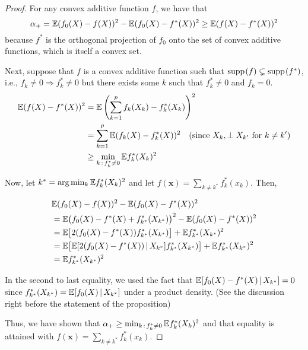 \begin{proof}

For any convex additive function $f$, we have that
\[
\alpha_+ = {\mathbb E} (f_0(X) - f(X))^2 - {\mathbb E} (f_0(X) - f^*(X))^2 \geq {\mathbb E} (f(X) - f^*(X))^2
\]
because $f^*$ is the orthogonal projection of $f_0$ onto the set of convex additive functions, which is itself a convex set. 

Next, suppose that $f$ is a convex additive function such that $\mathop{\text{supp}\kern.2ex}(f) \subsetneq \mathop{\text{supp}\kern.2ex}(f^*)$, i.e., $f_k \neq 0 \Rightarrow f^*_k \neq 0$ but there exists some $k$ such that $f^*_k \neq 0$ and $f_k = 0$. 
\begin{align*}
{\mathbb E} (f(X) - f^*(X))^2 & = {\mathbb E} \left( \sum_{k=1}^p f_k(X_k) - f^*_k(X_k) \right)^2 \\
   &= \sum_{k=1}^p {\mathbb E} (f_k(X) - f^*_k(X))^2  \quad \textrm{(since $X_k, \perp X_{k'}$ for $k \neq k'$)} \\
   &\geq \min_{k \,:\, f^*_k \neq 0} {\mathbb E} f^*_k(X_k)^2 
\end{align*}

Now, let $k^* = \arg\min_k {\mathbb E} f^*_k(X_k)^2$ and let $f(\mathbf{x}) = \sum_{k\neq k^*} f_k^*(x_k)$. Then,

\begin{align*}
& {\mathbb E} (f_0(X) - f(X))^2 - {\mathbb E} (f_0(X) - f^*(X))^2 \\
 &=
   {\mathbb E} \big(f_0(X) - f^*(X) + f^*_{k^*}(X_{k^*}) \big)^2 - {\mathbb E}( f_0(X) - f^*(X))^2 \\
 &= {\mathbb E} \big[ 2(f_0(X) - f^*(X)) f^*_{k^*} (X_{k^*}) \big] + {\mathbb E} f^*_{k^*}(X_{k^*})^2 \\
 &= {\mathbb E}\big[ {\mathbb E}[ 2(f_0(X) - f^*(X)) {\,|\,} X_{k^*}] f^*_{k^*}(X_{k^*}) \big] + {\mathbb E} f^*_{k^*}(X_{k^*})^2 \\
 &= {\mathbb E} f^*_{k^*}(X_{k^*})^2 
\end{align*}

In the second to last equality, we used the fact that ${\mathbb E}[ f_0(X) - f^*(X) {\,|\,} X_{k^*}] = 0$ since $f^*_{k^*}(X_{k^*}) = {\mathbb E}[ f_0(X) {\,|\,} X_{k^*} ]$ under a product density. (See the discussion right before the statement of the proposition)

Thus, we have shown that $\alpha_+ \geq \min_{k \,:\, f^*_k \neq 0} {\mathbb E} f_k^*(X_k)^2$ and that equality is attained with $f(\mathbf{x}) = \sum_{k\neq k^*} f_k^*(x_k)$. 

\end{proof}



